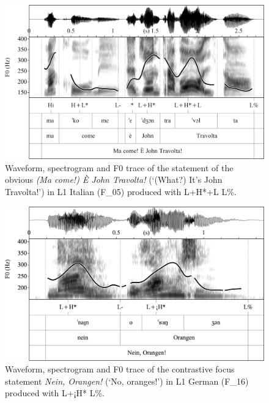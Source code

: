 \begin{figure}
\includegraphics[width=\textwidth]{figures/Figure_4.29.png}
\caption{Waveform, spectrogram and F0 trace of the statement of the obvious \textit{(Ma come!) È John Travolta!} (‘(What?) It’s John Travolta!’) in L1 Italian \mbox{(F\_05)} produced with L+H*+L L\%.}
\label{fig:4.29}
\end{figure}

\begin{figure}
\includegraphics[width=\textwidth]{figures/Figure_4.30.png}
\caption{Waveform, spectrogram and F0 trace of the contrastive focus statement \textit{Nein, Orangen!} (‘No, oranges!’) in L1 German \mbox{(F\_16)} produced with L+¡H* L\%.}
\label{fig:4.30}
\end{figure}

